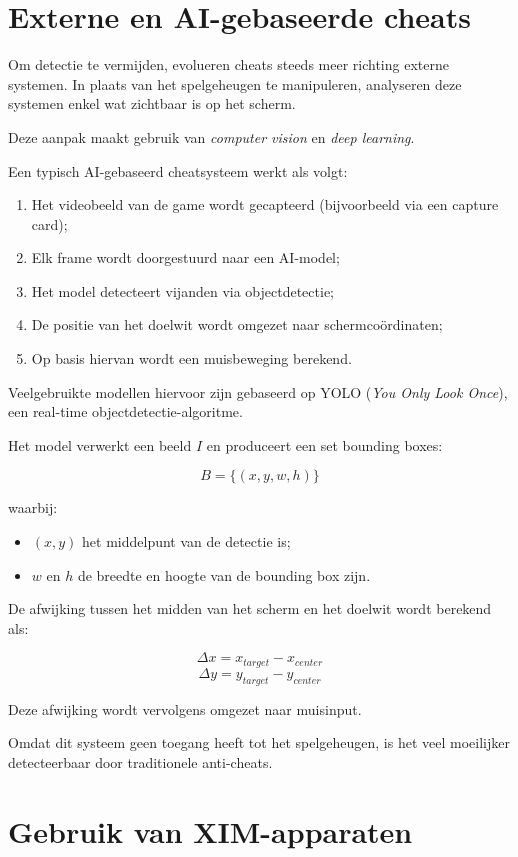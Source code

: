 \section{Externe en AI-gebaseerde cheats}

Om detectie te vermijden, evolueren cheats steeds meer richting externe systemen. In plaats van het spelgeheugen te manipuleren, analyseren deze systemen enkel wat zichtbaar is op het scherm.

Deze aanpak maakt gebruik van \textit{computer vision} en \textit{deep learning}.

Een typisch AI-gebaseerd cheatsysteem werkt als volgt:
\begin{enumerate}
    \item Het videobeeld van de game wordt gecapteerd (bijvoorbeeld via een capture card);
    \item Elk frame wordt doorgestuurd naar een AI-model;
    \item Het model detecteert vijanden via objectdetectie;
    \item De positie van het doelwit wordt omgezet naar schermcoördinaten;
    \item Op basis hiervan wordt een muisbeweging berekend.
\end{enumerate}

Veelgebruikte modellen hiervoor zijn gebaseerd op YOLO (\textit{You Only Look Once}), een real-time objectdetectie-algoritme.

Het model verwerkt een beeld \(I\) en produceert een set bounding boxes:

\[
B = \{(x, y, w, h)\}
\]

waarbij:
\begin{itemize}
    \item \((x, y)\) het middelpunt van de detectie is;
    \item \(w\) en \(h\) de breedte en hoogte van de bounding box zijn.
\end{itemize}

De afwijking tussen het midden van het scherm en het doelwit wordt berekend als:

\[
\Delta x = x_{target} - x_{center}
\]
\[
\Delta y = y_{target} - y_{center}
\]

Deze afwijking wordt vervolgens omgezet naar muisinput.

Omdat dit systeem geen toegang heeft tot het spelgeheugen, is het veel moeilijker detecteerbaar door traditionele anti-cheats.

\section{Gebruik van XIM-apparaten}

